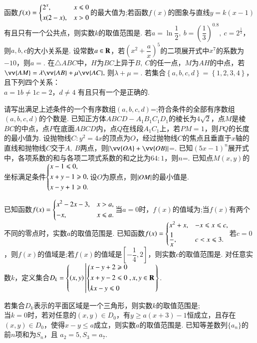 \documentclass[kindlepaper]{BHCexam4kindle}
\begin{document}
\begin{questions}
		
		\qs 函数$f(x)=\begin{dcases}
			2^x,&x\le0\\
			x(2-x),&x>0
		\end{dcases}$的最大值为\tk;若函数$f(x)$的图象与直线$ y=k(x-1) $有且只有一个公共点，则实数$ k $的取值范围是\tk.
		\qs 若$ a=\ln\dfrac{1}{2},\ b=\left(\dfrac{1}{3}\right)^{0.8},\ c=2^{\frac{1}{3}} $，则$ a,b,c $的大小关系是\tk.
		\qs 设常数$ a\inR $，若$ \left(x^2+\dfrac{a}{x}\right)^5 $的二项展开式中$ x^7 $的系数为$ -10 $，则$ a= $\tk.
		\qs 在$\triangle ABC$中，$ H $为$ BC $上异于$ B,\ C $的任一点，$ M $为$ AH $的中点，若$ \vv{AM}=\lambda\vv{AB}+\mu\vv{AC},\  $则$ \lambda+\mu =$\tk.
		\qs 若集合$ \left\{a,b,c,d\right\} =\left\{1,2,3,4\right\}$，且下列四个关系：\\
		$ a=1 $\qquad {}$b\ne1$\qquad{}$c=2$，\qquad{}$d\ne4$
		有且只有一个是正确的.\par
		请写出满足上述条件的一个有序数组$ \left(a,b,c,d\right) $=\tk;符合条件的全部有序数组$ \left(a,b,c,d\right) $的个数是\tk.
		\qs 已知正方体$ABCD-A_1B_1C_1D_1$的棱长为$ 4\sqrt{2} $，点$ M $是棱$ BC $的中点，点$ P $在底面$ ABCD $内，点$ Q $在线段$ A_1C_1 $上，若$ PM=1 $，则$ PQ $的长度的最小值为\tk.
		\qs 设抛物线$ C:y^2=4x $的顶点为$ O $，经过抛物线$ C $的焦点且垂直于$x$轴的直线和抛物线$ C $交于$ A,~B $两点，则$ \abs{\vv{OA}+\vv{OB}} $=\tk.
		\qs 已知$ \left(5x-1\right)^n $展开式中，各项系数的和与各项二项式系数的和之比为$ 64:1 $，则$ n $=\tk.
		\qs 已知点$ M\left(x,y\right) $的坐标满足条件$\begin{dcases}
		x-1\le 0,\\
		x+y-1\ge 0,\\
		x-y+1\ge 0.
		\end{dcases}$设$ O $为原点，则$ \abs{OM} $的最小值是\tk.
		
		\qs 已知函数$f(x)=\begin{dcases}
		x^2-2x-3,&x>a,\\
		-x,&x\le a.
		\end{dcases}$当$ a=0 $时，$f(x)$的值域为\tk;当$f(x)$有两个不同的零点时，实数$ a $的取值范围是\tk.
		\qs 已知函数$f(x)=\begin{dcases}
		x^2+x,&-x\le x\le c,\\
		\dfrac{1}{x},&c<x\le 3.
		\end{dcases}$若$ c=0 $，则$f(x)$的值域是\tk;若$f(x)$的值域是$ \left[-\dfrac{1}{4},2\right] $，则实数$ c $的取值范围是\tk.
		\qs 对任意实数$ k $，定义集合$ D_k=\left\{\left(x,y\right)\left|\begin{dcases}
		x-y+2\ge0\\
		x+y-2\le 0\\
		kx-y\le0 	
		\end{dcases},x,y\inR
		\right.\right\} $.\par 
		若集合$ D_k $表示的平面区域是一个三角形，则实数$ k $的取值范围是\tk;\\
		当$ k=0 $时，若对任意的$ \left(x,y\right)\in D_0 $，有$ y\ge a(x+3)-1 $恒成立，且存在$ \left(x,y\right)\in D_0 $，使得$ x-y\le a $成立，则实数$ a $的取值范围是\tk.
		\clearpage
		\qs 已知等差数列$\{a_n\}$的前$n$项和为$S_n$，且 $a_2=5,S_3=a_7 $.
		\begin{parts}

\end{parts}
\end{questions}
\end{document}
